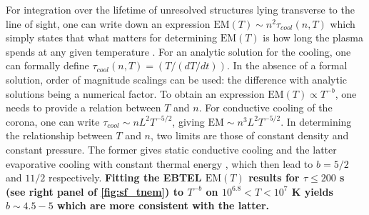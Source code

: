 \documentclass[iop]{emulateapj}
\begin{document}
		\par For integration over the lifetime of unresolved structures lying transverse to the line of sight, one can write down an expression $\mathrm{EM}(T) \sim n^2\tau_{cool}(n, T)$ which simply states that what matters for determining $\mathrm{EM}(T)$ is how long the plasma spends at any given temperature \citep[e.g.][]{cargill_implications_1994,cargill_nanoflare_2004}. For an analytic solution for the cooling, one can formally define $\tau_{cool}(n, T) = (T/(dT/dt))$. In the absence of a formal solution, order of magnitude scalings can be used: the difference with analytic solutions being a numerical factor. To obtain an expression $\mathrm{EM}(T)\propto T^{-b}$, one needs to provide a relation between $T$ and $n$. For conductive cooling of the corona, one can write $\tau_{cool} \sim nL^2T^{-5/2}$, giving $\mathrm{EM} \sim n^3L^2T^{-5/2}$. In determining the relationship between $T$ and $n$, two limits are those of constant density and constant pressure. The former gives static conductive cooling \citep[e.g.][]{antiochos_influence_1976} and the latter evaporative cooling with constant thermal energy \citep[e.g.][]{antiochos_evaporative_1978}, which then lead to $b = 5/2$ and $11/2$ respectively. \textbf{Fitting the EBTEL $\mathrm{EM}(T)$ results for $\tau\le200$ s (see right panel of \autoref{fig:sf_tnem}) to $T^{-b}$ on $10^{6.8}<T<10^{7}$ K yields $b\sim4.5-5$ which are more consistent with the latter.}
\end{document}
